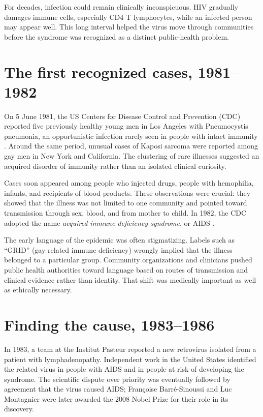 \documentclass[12pt,oneside]{book}
\begin{document}
For decades, infection could remain clinically inconspicuous. HIV gradually
damages immune cells, especially CD4 T lymphocytes, while an infected person
may appear well. This long interval helped the virus move through communities
before the syndrome was recognized as a distinct public-health problem.

\section{The first recognized cases, 1981--1982}
On 5 June 1981, the US Centers for Disease Control and Prevention (CDC) reported
five previously healthy young men in Los Angeles with Pneumocystis pneumonia, an
opportunistic infection rarely seen in people with intact immunity
\cite{cdc1981}. Around the same period, unusual cases of Kaposi sarcoma were
reported among gay men in New York and California. The clustering of rare
illnesses suggested an acquired disorder of immunity rather than an isolated
clinical curiosity.

Cases soon appeared among people who injected drugs, people with hemophilia,
infants, and recipients of blood products. These observations were crucial: they
showed that the illness was not limited to one community and pointed toward
transmission through sex, blood, and from mother to child. In 1982, the CDC
adopted the name \emph{acquired immune deficiency syndrome}, or AIDS
\cite{cdc1982}.

The early language of the epidemic was often stigmatizing. Labels such as
``GRID'' (gay-related immune deficiency) wrongly implied that the illness
belonged to a particular group. Community organizations and clinicians pushed
public health authorities toward language based on routes of transmission and
clinical evidence rather than identity. That shift was medically important as
well as ethically necessary.

\section{Finding the cause, 1983--1986}
In 1983, a team at the Institut Pasteur reported a new retrovirus isolated from
a patient with lymphadenopathy. Independent work in the United States identified
the related virus in people with AIDS and in people at risk of developing the
syndrome. The scientific dispute over priority was eventually followed by
agreement that the virus caused AIDS; Fran\c{c}oise Barr\'e-Sinoussi and Luc
Montagnier were later awarded the 2008 Nobel Prize for their role in its
discovery.
\end{document}
